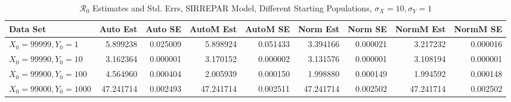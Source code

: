 \documentclass[12pt]{article}
\newcommand{\rr}{\ensuremath{\mathcal{R}_0}}
\begin{document}
\begin{table}[H]
	
	\caption{$\rr$ Estimates and Std. Errs, SIRREPAR Model,
		Different Starting Populations, 
		$\sigma_X = 10, \sigma_Y = 1$}
	\begin{footnotesize}
		\hskip -1.7cm
		\begin{tabular}{l|r|r|r|r|r|r|r|r}
			\hline
			Data Set & Auto Est & Auto SE & AutoM Est & AutoM SE & Norm Est & Norm SE & NormM Est & NormM SE\\
			\hline
			$X_0 = 99999, Y_0 = 1$ & 5.899238 & 0.025009 & 5.898924 & 0.051433 & 3.394166 & 0.000021 & 3.217232 & 0.000016\\
			\hline
			$X_0 = 99990, Y_0 = 10$ & 3.162364 & 0.000001 & 3.170152 & 0.000002 & 3.131576 & 0.000001 & 3.108194 & 0.000001\\
			\hline
			$X_0 = 99900, Y_0 = 100$ & 4.564960 & 0.000404 & 2.005939 & 0.000150 & 1.998880 & 0.000149 & 1.994592 & 0.000148\\
			\hline
			$X_0 = 99000, Y_0 = 1000$ & 47.241714 & 0.002493 & 47.241714 & 0.002511 & 47.241714 & 0.002502 & 47.241714 & 0.002502\\
			\hline
		\end{tabular}
	\end{footnotesize}
\end{table}
\end{document}
